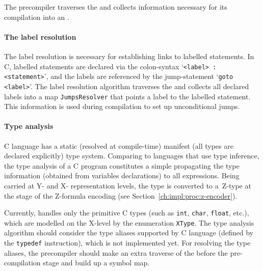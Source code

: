 The precompiler traverses the \ytree{} and collects information necessary for its compilation into an \xgraph{}.



\paragraph{The label resolution}


The label resolution is necessary for establishing links to labelled statements.
In C, labelled statements are declared via the colon-syntax `\lstinline{<label> : <statement>}', and the labels are referenced by the jump-statement `\lstinline{goto <label>}'.
The label resolution algorithm traverses the \ytree{} and collects all declared labels into a map \texttt{JumpsResolver} that points a label to the labelled statement.
This information is used during compilation to set up unconditional jumps.


\paragraph{Type analysis}

C language has a static (resolved at compile-time) manifest (all types are declared explicitly) type system.
Comparing to languages that use type inference, the type analysis of a C program constitutes a simple propagating the type information (obtained from variables declarations) to all expressions.
Being carried at Y- and X- representation levels, the type is converted to a~Z-type at the stage of the Z-formula encoding (see Section~\ref{ch:impl:proc:z-encoder}).

Currently, \porthos[2] handles only the primitive C types (such as \texttt{int}, \texttt{char}, \texttt{float}, etc.), which are modelled on the X-level by the enumeration \texttt{XType}.
The type analysis algorithm should consider the type aliases supported by C language (defined by the \texttt{typedef} instruction), which is not implemented yet.
For resolving the type aliases, the precompiler should make an extra traverse of the \ytree{} before the pre-compilation stage and build up a symbol map.


